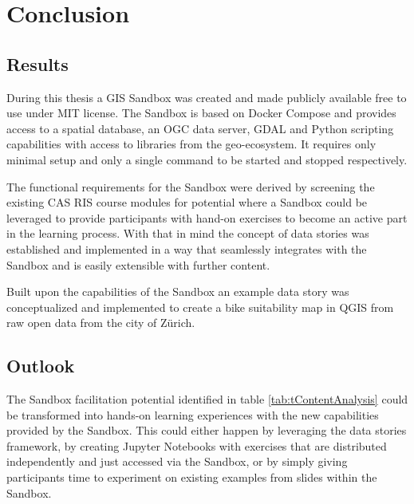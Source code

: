 \documentclass[11pt, a4paper, oneside, parskip=full-]{scrartcl}
\begin{document}
\section{Conclusion}

\subsection{Results}
During this thesis a GIS Sandbox was created and made publicly available free to
use under MIT license\cite{osgeostacksandbox}. The Sandbox is based on Docker
Compose and provides access to a spatial database, an OGC data server, GDAL and
Python scripting capabilities with access to libraries from the geo-ecosystem.
It requires only minimal setup and only a single command to be started and
stopped respectively.

The functional requirements for the Sandbox were derived by screening the
existing CAS RIS course modules for potential where a Sandbox could be leveraged
to provide participants with hand-on exercises to become an active part in the
learning process. With that in mind the concept of data stories was established
and implemented in a way that seamlessly integrates with the Sandbox and is
easily extensible with further content.

Built upon the capabilities of the Sandbox an example data story was
conceptualized and implemented to create a bike suitability map in QGIS from raw
open data from the city of Zürich.

\subsection{Outlook}
The Sandbox facilitation potential identified in table
\ref{tab:tContentAnalysis} could be transformed into hands-on learning
experiences with the new capabilities provided by the Sandbox. This could either
happen by leveraging the data stories framework, by creating Jupyter Notebooks
with exercises that are distributed independently and just accessed via the
Sandbox, or by simply giving participants time to experiment on existing
examples from slides within the Sandbox.

\newpage
\printbibliography
\end{document}
